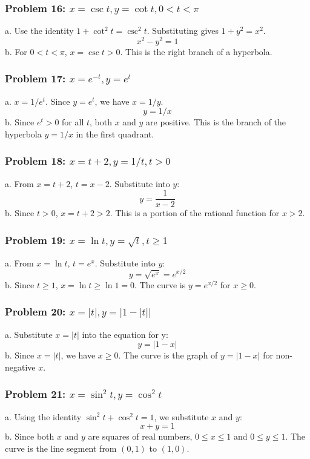 \documentclass{article}
\begin{document}
\subsubsection{Problem 16: \(x=\csc t, y=\cot t, 0 < t < \pi\)}
a. Use the identity \(1+\cot^2 t = \csc^2 t\). Substituting gives \(1+y^2=x^2\).
\[x^2 - y^2 = 1\]
b. For \(0 < t < \pi\), \(x = \csc t > 0\). This is the right branch of a hyperbola.

\subsubsection{Problem 17: \(x=e^{-t}, y=e^t\)}
a. \(x = 1/e^t\). Since \(y=e^t\), we have \(x = 1/y\).
\[y = 1/x\]
b. Since \(e^t > 0\) for all \(t\), both \(x\) and \(y\) are positive. This is the branch of the hyperbola \(y=1/x\) in the first quadrant.

\subsubsection{Problem 18: \(x=t+2, y=1/t, t>0\)}
a. From \(x=t+2\), \(t=x-2\). Substitute into \(y\):
\[y = \frac{1}{x-2}\]
b. Since \(t>0\), \(x=t+2 > 2\). This is a portion of the rational function for \(x>2\).

\subsubsection{Problem 19: \(x=\ln t, y=\sqrt{t}, t \ge 1\)}
a. From \(x=\ln t\), \(t = e^x\). Substitute into \(y\):
\[y = \sqrt{e^x} = e^{x/2}\]
b. Since \(t \ge 1\), \(x = \ln t \ge \ln 1 = 0\). The curve is \(y=e^{x/2}\) for \(x \ge 0\).

\subsubsection{Problem 20: \(x=|t|, y=|1-|t||\)}
a. Substitute \(x=|t|\) into the equation for y:
\[y = |1-x|\]
b. Since \(x=|t|\), we have \(x \ge 0\). The curve is the graph of \(y=|1-x|\) for non-negative \(x\).

\subsubsection{Problem 21: \(x=\sin^2 t, y=\cos^2 t\)}
a. Using the identity \(\sin^2 t + \cos^2 t = 1\), we substitute \(x\) and \(y\):
\[x+y=1\]
b. Since both \(x\) and \(y\) are squares of real numbers, \(0 \le x \le 1\) and \(0 \le y \le 1\). The curve is the line segment from \((0,1)\) to \((1,0)\).
\end{document}
